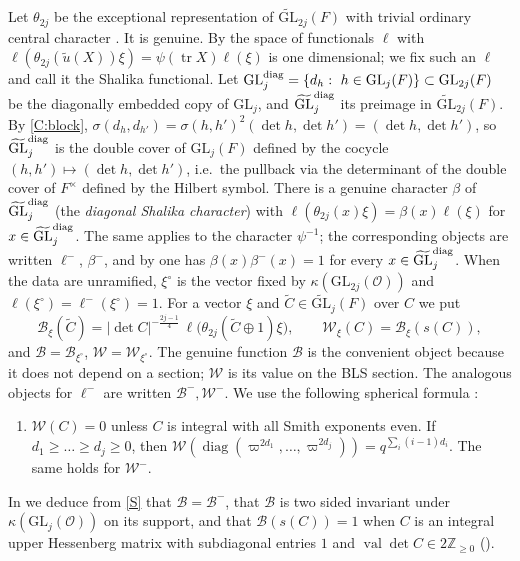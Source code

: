 \documentclass[11pt,oneside,notitlepage]{book}
\numberwithin{equation}{section}
\theoremstyle{plain}
\theoremstyle{definition}
\newcommand{\Z}{\mathbb{Z}}
\newcommand{\cO}{\mathcal{O}}
\newcommand{\GL}{\mathrm{GL}}
\newcommand{\cW}{\mathcal{W}}
\newcommand{\cB}{\mathcal{B}}
\newcommand{\tGL}{\widetilde{\GL}}
\newcommand{\tr}{\operatorname{tr}}
\newcommand{\val}{\operatorname{val}}
\newcommand{\diag}{\operatorname{diag}}
\newcommand{\hil}[2]{(#1,#2)}
\begin{document}
Let $\theta_{2j}$ be the exceptional representation of $\tGL_{2j}(F)$ with trivial ordinary central character \cite{Kable,KM}. It is genuine. By \cite[Theorem 3.1]{Kaplan} the space of functionals $\ell$ with $\ell(\theta_{2j}(\tilde u(X))\xi)=\psi(\tr X)\ell(\xi)$ is one dimensional; we fix such an $\ell$ and call it the Shalika functional. Let $\GL_j^{\rm diag}=\{d_h:\ h\in\GL_j(F)\}\subset\GL_{2j}(F)$ be the diagonally embedded copy of $\GL_j$, and $\tGL_j^{\rm diag}$ its preimage in $\tGL_{2j}(F)$. By \ref{C:block}, $\sigma(d_h,d_{h'})=\sigma(h,h')^2\hil{\det h}{\det h'}=\hil{\det h}{\det h'}$, so $\tGL_j^{\rm diag}$ is the double cover of $\GL_j(F)$ defined by the cocycle $(h,h')\mapsto\hil{\det h}{\det h'}$, i.e.\ the pullback via the determinant of the double cover of $F^\times$ defined by the Hilbert symbol. There is a genuine character $\beta$ of $\tGL_j^{\rm diag}$ (the \emph{diagonal Shalika character}) with $\ell(\theta_{2j}(x)\xi)=\beta(x)\ell(\xi)$ for $x\in\tGL_j^{\rm diag}$. The same applies to the character $\psi^{-1}$; the corresponding objects are written $\ell^-$, $\beta^-$, and by \cite[\S1.6, \S4.2]{KM} one has $\beta(x)\beta^-(x)=1$ for every $x\in\tGL_j^{\rm diag}$. When the data are unramified, $\xi^\circ$ is the vector fixed by $\kappa(\GL_{2j}(\cO))$ and $\ell(\xi^\circ)=\ell^-(\xi^\circ)=1$. For a vector $\xi$ and $\tilde C\in\tGL_j(F)$ over $C$ we put
\begin{equation}\label{eq:Wcoef}
\cB_\xi(\tilde C)=|\det C|^{-\frac{2j-1}4}\,\ell\bigl(\theta_{2j}(\tilde C\oplus1)\xi\bigr),\qquad \cW_\xi(C)=\cB_\xi(s(C)),
\end{equation}
and $\cB=\cB_{\xi^\circ}$, $\cW=\cW_{\xi^\circ}$. The genuine function $\cB$ is the convenient object because it does not depend on a section; $\cW$ is its value on the BLS section. The analogous objects for $\ell^-$ are written $\cB^-,\cW^-$. We use the following spherical formula \cite[Lemma 4.2]{KM}:
\begin{enumerate}[label=(S)]
\item\label{S} $\cW(C)=0$ unless $C$ is integral with all Smith exponents even. If $d_1\ge\dots\ge d_j\ge0$, then $\cW(\diag(\varpi^{2d_1},\dots,\varpi^{2d_j}))=q^{\sum_i(i-1)d_i}$. The same holds for $\cW^-$.
\end{enumerate}
In  we deduce from \ref{S} that $\cB=\cB^-$, that $\cB$ is two sided invariant under $\kappa(\GL_j(\cO))$ on its support, and that $\cB(s(C))=1$ when $C$ is an integral upper Hessenberg matrix with subdiagonal entries $1$ and $\val\det C\in 2\Z_{\ge0}$ ().
\end{document}
